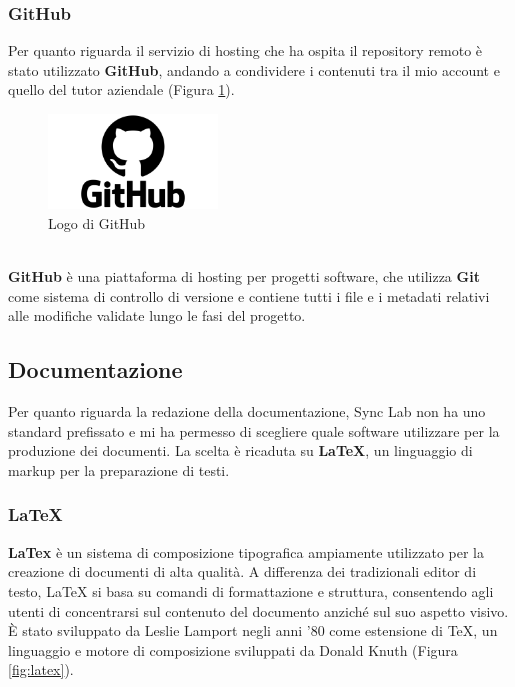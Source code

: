 \subsubsection{GitHub}
Per quanto riguarda il servizio di hosting che ha ospita il \gls{repository}{} remoto è stato utilizzato \textbf{GitHub}, andando a condividere 
i contenuti tra il mio account e quello del tutor aziendale (Figura \ref{fig:github}).\\
\begin{figure}[hpp]
    \centering
    \includegraphics[width=0.4\textwidth]{images/tecnologie/logo_github.png}
    \caption{Logo di GitHub}
    \label{fig:github}
\end{figure}
\\
\textbf{GitHub} è una piattaforma di hosting per progetti software, che utilizza \textbf{Git} come sistema di controllo di versione e contiene tutti 
i file e i \gls{metadati}{} relativi alle modifiche validate lungo le fasi del progetto.\\
\pagebreak
\subsection{Documentazione}
Per quanto riguarda la redazione della documentazione, Sync Lab non ha uno standard prefissato e mi ha permesso di scegliere quale software utilizzare per la 
produzione dei documenti. La scelta è ricaduta su \textbf{LaTeX}, un linguaggio di markup per la preparazione di testi.\\
\subsubsection{LaTeX}
\textbf{LaTex}  è un sistema di composizione tipografica ampiamente utilizzato per la creazione di documenti di alta qualità. A differenza dei tradizionali editor di testo, LaTeX si basa su comandi di formattazione e struttura, consentendo agli utenti di concentrarsi sul contenuto del documento anziché sul suo aspetto visivo.\\
È stato sviluppato da Leslie Lamport negli anni '80 come estensione di TeX, un linguaggio e motore di composizione sviluppati da Donald Knuth (Figura \ref{fig:latex}).

